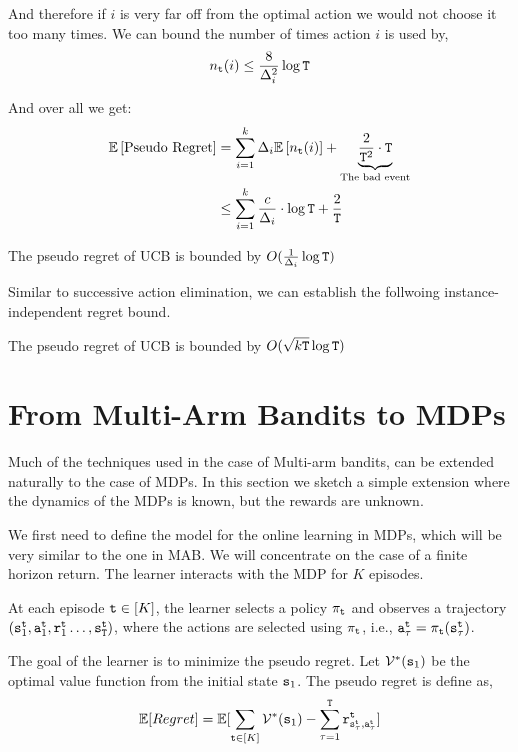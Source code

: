 And therefore if $i$ is very far off from the optimal action we
would not choose it too many times. We can bound the number of times
action $i$ is used by,
\[
n_{{\tt t}}(i)\leq\frac{8}{\Delta_{i}^{2}}\log {\tt T}
\]

And over all we get:
\begin{align*}
\mathbb{E}\left[\text{Pseudo Regret}\right] & =
\sum_{i=1}^{k}\Delta_{i}\mathbb{E}\left[n_{{\tt t}}(i)\right]+\underbrace{\frac{2}{{\tt T}^{2}}\cdot
{\tt T}}_{\text{The bad event}}
\\
 & \le  \sum_{i=1}^{k}\frac{c}{\Delta_{i}}\cdot\log {\tt T}+\frac{2}{{\tt T}}
\end{align*}

\begin{theorem}
\label{thm:MAB:UCB1}
The pseudo regret of UCB is bounded by $O(\frac{1}{\Delta_{i}}\log {\tt T})$
\end{theorem}

Similar to successive action elimination, we can establish the follwoing instance-independent regret bound. 

\begin{theorem}
\label{thm:MAB:UCB2}
The pseudo regret of UCB is bounded by $O( \sqrt{k{\tt T}}\log{\tt T})$
\end{theorem}

\section{From Multi-Arm Bandits to MDPs}

Much of the techniques used in the case of Multi-arm bandits, can be extended naturally to the case of MDPs. In this section we sketch a simple extension where the dynamics of the MDPs is known, but the rewards are unknown.

We first need to define the model for the online learning in MDPs, which will be very similar to the one in MAB. We will concentrate on the case of a finite horizon return. The learner interacts with the MDP for $K$ episodes.

At each episode ${\tt t}\in[K]$, the learner selects a policy $\pi_{\tt t}$ and observes a trajectory $({\tt s}^{\tt t}_1, {\tt a}^{\tt t}_1,{\tt r}^{\tt t}_1 \ldots , {\tt s}_{\tt T}^{\tt t})$, where the actions are selected using $\pi_{\tt t}$, i.e., ${\tt a}_\tau^{\tt t}=\pi_{\tt t}({\tt s}_\tau^{\tt t})$.

The goal of the learner is to minimize the pseudo regret. Let $\mathcal{V}^*({\tt s}_1)$ be the optimal value function from the initial state ${\tt s}_1$. The pseudo regret is define as,
\[
\mathbb{E}[Regret] = \mathbb{E}[\sum_{{\tt t}\in[K]}\mathcal{V}^*({\tt s}_1)-\sum_{\tau=1}^{\tt T} {\tt r}^{\tt t}_{{\tt s}_\tau^{\tt t},{\tt a}_\tau^{\tt t}}]
\]

